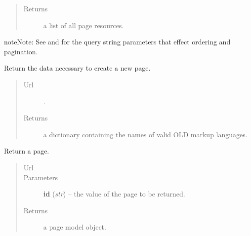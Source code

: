 \documentclass[letterpaper,10pt,english]{sphinxmanual}
\begin{document}
\begin{fulllineitems}
\begin{fulllineitems}
\begin{quote}
\begin{description}
\item[{Returns}] \leavevmode
a list of all page resources.

\end{description}\end{quote}

\begin{notice}{note}{Note:}
See  and  for the
query string parameters that effect ordering and pagination.
\end{notice}

\end{fulllineitems}


\begin{fulllineitems}
\label{api:onlinelinguisticdatabase.controllers.pages.PagesController.new}
Return the data necessary to create a new page.
\begin{quote}\begin{description}
\item[{Url }] \leavevmode
{}.

\item[{Returns}] \leavevmode
a dictionary containing the names of valid OLD markup languages.

\end{description}\end{quote}

\end{fulllineitems}


\begin{fulllineitems}
\label{api:onlinelinguisticdatabase.controllers.pages.PagesController.show}
Return a page.
\begin{quote}\begin{description}
\item[{Url }] \leavevmode
{}

\item[{Parameters}] \leavevmode
\textbf{id} (\emph{str}) -- the  value of the page to be returned.

\item[{Returns}] \leavevmode
a page model object.


\end{description}
\end{quote}
\end{fulllineitems}
\end{fulllineitems}
\end{document}

